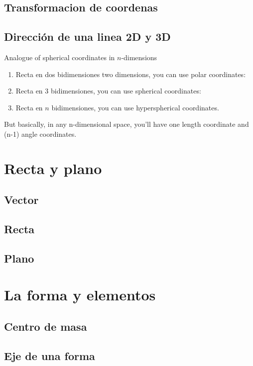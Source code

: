 \documentclass[a4paper]{book}
\begin{document}
\section{Transformacion de coordenas}

\section{Dirección de una linea 2D y 3D}


Analogue of spherical coordinates in $n$-dimensions

\begin{enumerate}
\item Recta en dos bidimensiones two dimensions, you can use polar coordinates:
\item Recta en 3 bidimensiones, you can use spherical coordinates:
\item Recta en $n$ bidimensiones, you can use hyperspherical coordinates.
\end{enumerate}

But basically, in any n-dimensional space, you'll have one length coordinate and (n-1) angle coordinates.

\chapter{Recta y plano}


\section{Vector}

\section{Recta}

\section{Plano}

\chapter{La forma y elementos}
\section{Centro de masa}
\section{Eje de una forma}
\end{document}
